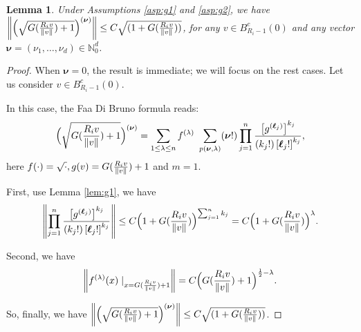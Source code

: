 \documentclass[a4paper, 11pt]{article}
\newcounter{results}[section]
\theoremstyle{plain}
\newtheorem{lemma}[results]{Lemma}
\theoremstyle{remark}
\theoremstyle{definition}
\begin{document}
		\begin{lemma}\label{lem:g2}Under Assumptions \ref{asp:g1} and \ref{asp:g2}, we have $\norm{\Big(\sqrt{G(\frac{R_i v}{\norm{v}})+1}\Big)^{(\boldsymbol{\nu})}}\leq C\sqrt{(1+G(\frac{R_i v}{\norm{v}}))}$, for any $v\in B_{R_i-1}^c(0)$ and any vector $\boldsymbol{\nu}=\left(\nu_1, \ldots, \nu_d\right) \in \mathbb{N}_0^d$.
		\end{lemma}
		\begin{proof}
			When $\boldsymbol{\nu}=0$, the result is immediate; we will focus on the rest cases. Let us consider $v\in B^c_{R_i-1}(0)$.
			
			In this case, the Faa Di Bruno formula reads:
			\begin{equation}
				\Big(\sqrt{G(\frac{R_i v}{\norm{v}})+1}\Big)^{(\boldsymbol{\nu})}=\sum_{1 \leq\lambda \leq n} f^{({\lambda})} \ \sum_{p(\boldsymbol{\nu}, {\lambda})}(\boldsymbol{\nu}!) \prod_{j=1}^n \frac{\left[{g}^{(\boldsymbol{\ell}_j)}\right]^{{k}_j}}{\left({k}_{j}!\right)\left[\boldsymbol{\ell}_{j}!\right]^{{k}_j}},
			\end{equation}
            here $f(\cdot)=\sqrt{\cdot}, g(v)=G(\frac{R_iv}{\norm{v}})+1$ and $m=1$.
			
			First, use Lemma \ref{lem:g1}, we have 
			\begin{equation}
				\norm{\prod_{j=1}^n \frac{\left[{g}^{(\boldsymbol{\ell}_j)}\right]^{{k}_j}}{\left({k}_{j}!\right)\left[\boldsymbol{\ell}_{j}!\right]^{{k}_j}}}\leq C\Big(1+G(\frac{R_i v}{\norm{v}})\Big)^{\sum_{j=1}^nk_j}=C\Big(1+G(\frac{R_i v}{\norm{v}})\Big)^{\lambda}.
			\end{equation}
			
			Second, we have
			\begin{equation}
				\norm{f^{(\lambda)}(x)\mid_{x=G(\frac{R_i v}{\norm{v}})+1}}= C\Big(G(\frac{R_i v}{\norm{v}})+1\Big)^{\frac{1}{2}-\lambda}.
			\end{equation}
			
			
			So, finally, we have $\norm{\Big(\sqrt{G(\frac{R_i v}{\norm{v}})+1}\Big)^{(\boldsymbol{\nu})}}\leq C\sqrt{(1+G(\frac{R_i v}{\norm{v}}))}$.
		\end{proof}
		
\end{document}
